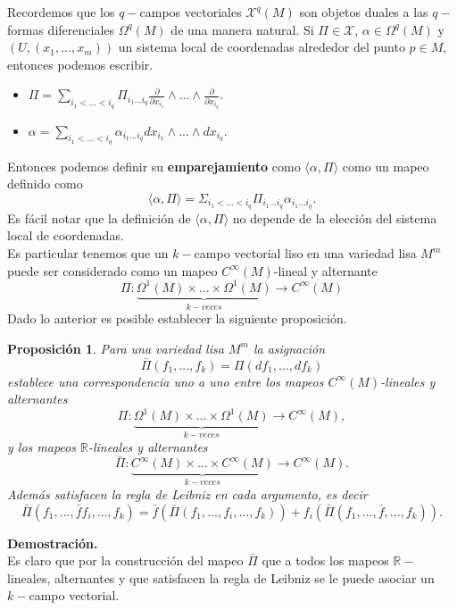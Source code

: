 \documentclass[a4paper,10pt]{book}
\newtheorem{propo}{Proposici\'on}[chapter]
\begin{document}
Recordemos que los $q-$campos vectoriales $\mathcal{X}^{q}(M)$ son objetos duales a las $q-$formas diferenciales $\Omega^{q}(M)$ de una manera natural. Si $\Pi\in\mathcal{X}$, $\alpha\in\Omega^{q}(M)$ y $(U,(x_{1},...,x_{m}))$ un sistema local de coordenadas alrededor del punto $p\in M$, entonces podemos escribir.

\begin{itemize}
    \item $\Pi = \sum\limits_{i_{1}<...<i_{q}}\Pi_{i_{1}...i_{q}}\frac{\partial}{\partial x_{i_{1}}}\wedge...\wedge\frac{\partial}{\partial x_{i_{q}}}.$
    \item $\alpha = \sum\limits_{i_{1}<...<i_{q}}\alpha_{i_{1}...i_{q}}d x_{i_{1}}\wedge...\wedge d x_{i_{q}}.$
\end{itemize}

Entonces podemos definir su {\bfseries emparejamiento} como $\langle\alpha,\Pi\rangle$ como un mapeo definido como 
\begin{equation}
\langle\alpha,\Pi\rangle = \Sigma_{i_{1}<...<i_{q}}\Pi_{i_{1}...i_{q}}\alpha_{i_{1}...i_{q}}.
\end{equation}
Es f\'acil notar que la definici\'on de $\langle\alpha,\Pi\rangle$ no depende de la elecci\'on del sistema local de coordenadas.\\ 

Es particular tenemos que un $k-$campo vectorial liso en una variedad lisa $M^{m}$ puede ser considerado como un mapeo $C^{\infty}(M)$-lineal y alternante 
$$\Pi:\underbrace{\Omega^{1}(M)\times...\times\Omega^{1}(M)}_{k-veces}\to C^{\infty}(M)$$
Dado lo anterior es posible establecer la siguiente proposici\'on.

\begin{propo}\label{Propo2.1.1}
Para una variedad lisa $M^{m}$ la asignaci\'on  
\begin{equation*}
    \bar{\Pi}(f_{1},...,f_{k})=\Pi(d f_{1},...,d f_{k})
\end{equation*}
establece una correspondencia uno a uno entre los mapeos $C^{\infty}(M)$-lineales y alternantes 
\begin{equation*}
    \Pi:\underbrace{\Omega^{1}(M)\times...\times\Omega^{1}(M)}_{k-veces}\to C^{\infty}(M),
\end{equation*}
y los mapeos $\mathbb{R}$-lineales y alternantes 
\begin{equation*}
    \bar{\Pi}:\underbrace{C^{\infty}(M)\times...\times C^{\infty}(M)}_{k-veces}\to C^{\infty}(M).
\end{equation*}
Adem\'as satisfacen la regla de Leibniz en cada argumento, es decir 
\begin{equation*}
    \bar{\Pi}(f_{1},...,\bar{f}f_{i},...,f_{k})=\bar{f}(\bar{\Pi}(f_{1},...,f_{i},...,f_{k}))+f_{i}(\bar{\Pi}(f_{1},...,\bar{f},...,f_{k})).
\end{equation*}
\end{propo}
{\bfseries Demostraci\'on.}\\
Es claro que por la construcci\'on del mapeo $\bar{\Pi}$ que a todos los mapeos $\mathbb{R}-$lineales, alternantes y que satisfacen la regla de Leibniz se le puede asociar un $k-$campo vectorial.\\
\end{document}
